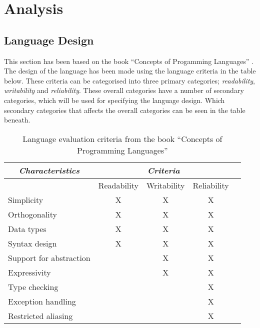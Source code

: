 \part{Analysis}
\chapter{Language Design}

This section has been based on the book ``Concepts of Progamming Languages'' \cite{CoPL}. The design of the language has been made using the language criteria in the table below. These criteria can be categorised into three primary categories; \textit{readability}, \textit{writability} and \textit{reliability}. These overall categories have a number of secondary categories, which will be used for specifying the language design. Which secondary categories that affects the overall categories can be seen in the table beneath.

\begin{table}[htbp]
\centering
\begin{tabular}{|l|c|c|c|c|}
\hline
\multicolumn{1}{|c|}{\textit{Characteristics}} & \multicolumn{3}{|c|}{\textit{Criteria}} \\ \hline
 & Readability & Writability & Reliability \\ \hline
Simplicity & X & X & X \\ \hline
Orthogonality & X & X & X \\ \hline
Data types & X & X & X \\ \hline
Syntax design & X & X & X  \\ \hline
Support for abstraction & & X & X  \\ \hline
Expressivity & & X & X \\ \hline
Type checking & & & X \\ \hline
Exception handling & & & X \\ \hline
Restricted aliasing & & & X \\ \hline
\end{tabular}
\caption{Language evaluation criteria from the book ``Concepts of Programming Languages''\cite{CoPL}}
\label{tbl:evaluation criteria}
\end{table}

